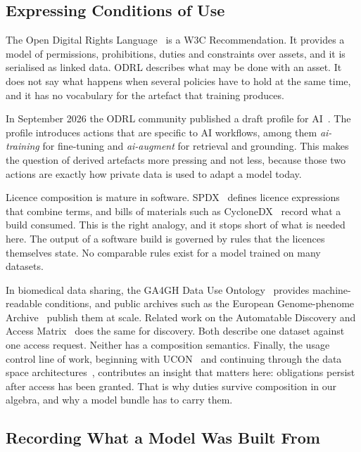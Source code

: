 \documentclass[10pt,conference]{IEEEtran}
\begin{document}
\subsection{Expressing Conditions of Use}

The Open Digital Rights Language~\cite{odrl-model,odrl-vocab} is a W3C
Recommendation. It provides a model of permissions, prohibitions, duties and
constraints over assets, and it is serialised as linked data. ODRL describes
what may be done with an asset. It does not say what happens when several
policies have to hold at the same time, and it has no vocabulary for the
artefact that training produces.

In September 2026 the ODRL community published a draft profile for
AI~\cite{odrl-ai}. The profile introduces actions that are specific to AI
workflows, among them \emph{ai-training} for fine-tuning and
\emph{ai-augment} for retrieval and grounding. This makes the question of
derived artefacts more pressing and not less, because those two actions are
exactly how private data is used to adapt a model today.

Licence composition is mature in software. SPDX~\cite{spdx} defines licence
expressions that combine terms, and bills of materials such as
CycloneDX~\cite{cyclonedx} record what a build consumed. This is the right
analogy, and it stops short of what is needed here. The output of a software
build is governed by rules that the licences themselves state. No comparable
rules exist for a model trained on many datasets.

In biomedical data sharing, the GA4GH Data Use Ontology~\cite{duo} provides
machine-readable conditions, and public archives such as the European
Genome-phenome Archive~\cite{ega} publish them at scale. Related work on the
Automatable Discovery and Access Matrix~\cite{adam} does the same for discovery.
Both describe one dataset against one access request. Neither has a composition
semantics. Finally, the usage control line of work, beginning with
UCON~\cite{ucon} and continuing through the data space
architectures~\cite{ids}, contributes an insight that matters here: obligations
persist after access has been granted. That is why duties survive composition
in our algebra, and why a model bundle has to carry them.

\subsection{Recording What a Model Was Built From}
\end{document}
